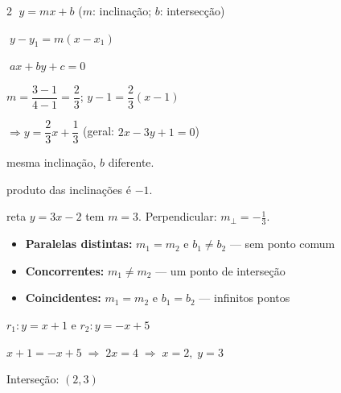 \documentclass[12pt]{article}
\begin{document}
\begin{multicols}{2}
 $\;y = mx + b$ \hfill ($m$: inclinação; $b$: intersecção)

 $\;y - y_1 = m(x - x_1)$

 $\;ax + by + c = 0$


$m = \dfrac{3-1}{4-1} = \dfrac{2}{3}$; \quad $y - 1 = \dfrac{2}{3}(x-1)$

$\Rightarrow y = \dfrac{2}{3}x + \dfrac{1}{3}$ \quad (geral: $2x - 3y + 1 = 0$)



 mesma inclinação, $b$ diferente.


 produto das inclinações é $-1$.


 reta $y = 3x - 2$ tem $m = 3$. Perpendicular: $m_\perp = -\tfrac{1}{3}$.



\begin{itemize}
\item \textbf{Paralelas distintas:} $m_1 = m_2$ e $b_1 \neq b_2$ — sem ponto comum
\item \textbf{Concorrentes:} $m_1 \neq m_2$ — um ponto de interseção
\item \textbf{Coincidentes:} $m_1 = m_2$ e $b_1 = b_2$ — infinitos pontos
\end{itemize}


$r_1: y = x+1$ e $r_2: y = -x+5$

$x+1 = -x+5 \;\Rightarrow\; 2x = 4 \;\Rightarrow\; x = 2,\; y = 3$

Interseção: $\boxed{(2, 3)}$



\end{multicols}
\end{document}
